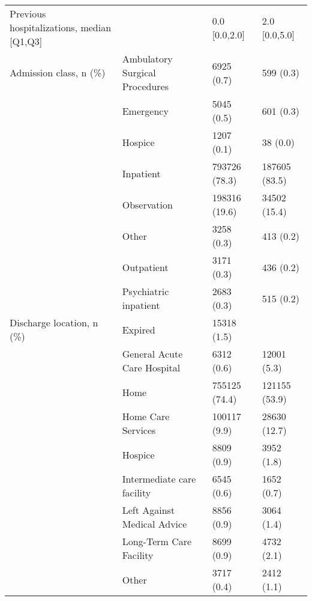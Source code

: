 \begin{tabular}{llll}
Previous hospitalizations, median [Q1,Q3] &   &                  0.0 [0.0,2.0] &     2.0 [0.0,5.0] \\
Admission class, n (\%) & Ambulatory Surgical Procedures &                     6925 (0.7) &         599 (0.3) \\
                                       & Emergency &                     5045 (0.5) &         601 (0.3) \\
                                       & Hospice &                     1207 (0.1) &          38 (0.0) \\
                                       & Inpatient &                  793726 (78.3) &     187605 (83.5) \\
                                       & Observation &                  198316 (19.6) &      34502 (15.4) \\
                                       & Other &                     3258 (0.3) &         413 (0.2) \\
                                       & Outpatient &                     3171 (0.3) &         436 (0.2) \\
                                       & Psychiatric inpatient &                     2683 (0.3) &         515 (0.2) \\
Discharge location, n (\%) & Expired &                    15318 (1.5) &                   \\
                                       & General Acute Care Hospital &                     6312 (0.6) &       12001 (5.3) \\
                                       & Home &                  755125 (74.4) &     121155 (53.9) \\
                                       & Home Care Services &                   100117 (9.9) &      28630 (12.7) \\
                                       & Hospice &                     8809 (0.9) &        3952 (1.8) \\
                                       & Intermediate care facility &                     6545 (0.6) &        1652 (0.7) \\
                                       & Left Against Medical Advice &                     8856 (0.9) &        3064 (1.4) \\
                                       & Long-Term Care Facility &                     8699 (0.9) &        4732 (2.1) \\
                                       & Other &                     3717 (0.4) &        2412 (1.1) \\

\end{tabular}
